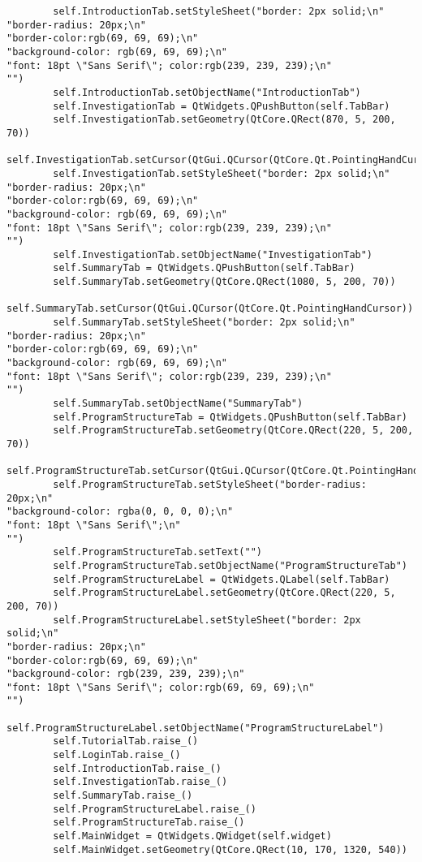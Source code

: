 \documentclass{article}
\begin{document}
\begin{lstlisting}
        self.IntroductionTab.setStyleSheet("border: 2px solid;\n"
"border-radius: 20px;\n"
"border-color:rgb(69, 69, 69);\n"
"background-color: rgb(69, 69, 69);\n"
"font: 18pt \"Sans Serif\"; color:rgb(239, 239, 239);\n"
"")
        self.IntroductionTab.setObjectName("IntroductionTab")
        self.InvestigationTab = QtWidgets.QPushButton(self.TabBar)
        self.InvestigationTab.setGeometry(QtCore.QRect(870, 5, 200, 70))
        self.InvestigationTab.setCursor(QtGui.QCursor(QtCore.Qt.PointingHandCursor))
        self.InvestigationTab.setStyleSheet("border: 2px solid;\n"
"border-radius: 20px;\n"
"border-color:rgb(69, 69, 69);\n"
"background-color: rgb(69, 69, 69);\n"
"font: 18pt \"Sans Serif\"; color:rgb(239, 239, 239);\n"
"")
        self.InvestigationTab.setObjectName("InvestigationTab")
        self.SummaryTab = QtWidgets.QPushButton(self.TabBar)
        self.SummaryTab.setGeometry(QtCore.QRect(1080, 5, 200, 70))
        self.SummaryTab.setCursor(QtGui.QCursor(QtCore.Qt.PointingHandCursor))
        self.SummaryTab.setStyleSheet("border: 2px solid;\n"
"border-radius: 20px;\n"
"border-color:rgb(69, 69, 69);\n"
"background-color: rgb(69, 69, 69);\n"
"font: 18pt \"Sans Serif\"; color:rgb(239, 239, 239);\n"
"")
        self.SummaryTab.setObjectName("SummaryTab")
        self.ProgramStructureTab = QtWidgets.QPushButton(self.TabBar)
        self.ProgramStructureTab.setGeometry(QtCore.QRect(220, 5, 200, 70))
        self.ProgramStructureTab.setCursor(QtGui.QCursor(QtCore.Qt.PointingHandCursor))
        self.ProgramStructureTab.setStyleSheet("border-radius: 20px;\n"
"background-color: rgba(0, 0, 0, 0);\n"
"font: 18pt \"Sans Serif\";\n"
"")
        self.ProgramStructureTab.setText("")
        self.ProgramStructureTab.setObjectName("ProgramStructureTab")
        self.ProgramStructureLabel = QtWidgets.QLabel(self.TabBar)
        self.ProgramStructureLabel.setGeometry(QtCore.QRect(220, 5, 200, 70))
        self.ProgramStructureLabel.setStyleSheet("border: 2px solid;\n"
"border-radius: 20px;\n"
"border-color:rgb(69, 69, 69);\n"
"background-color: rgb(239, 239, 239);\n"
"font: 18pt \"Sans Serif\"; color:rgb(69, 69, 69);\n"
"")
        self.ProgramStructureLabel.setObjectName("ProgramStructureLabel")
        self.TutorialTab.raise_()
        self.LoginTab.raise_()
        self.IntroductionTab.raise_()
        self.InvestigationTab.raise_()
        self.SummaryTab.raise_()
        self.ProgramStructureLabel.raise_()
        self.ProgramStructureTab.raise_()
        self.MainWidget = QtWidgets.QWidget(self.widget)
        self.MainWidget.setGeometry(QtCore.QRect(10, 170, 1320, 540))

\end{lstlisting}
\end{document}
